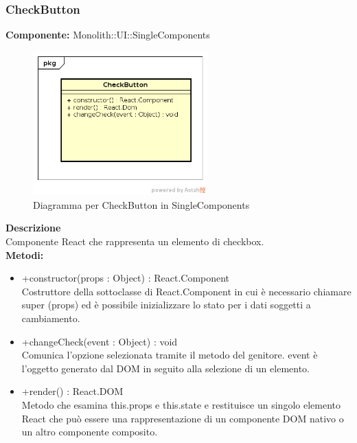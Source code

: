 \subsubsection{CheckButton}
\textbf{Componente:}  Monolith::UI::SingleComponents\\
   \FloatBarrier
   \begin{figure}[ht]
   \centering
   \includegraphics[width=0.6\textwidth]{img/single-CheckButton.png}
   \caption{{Diagramma per CheckButton in SingleComponents}}
\end{figure}
\FloatBarrier
\textbf{Descrizione}\\
Componente React che rappresenta un elemento di checkbox. \\
\textbf{Metodi:} 
\begin{itemize}

\item +constructor(props : Object) : React.Component 
\\
Costruttore della sottoclasse di React.Component in cui è necessario chiamare super (props) ed è possibile inizializzare lo stato per i dati soggetti a cambiamento.

\item +changeCheck(event : Object) : void  
\\
Comunica l’opzione selezionata tramite il metodo del genitore. event è l'oggetto generato dal DOM in seguito alla selezione di un elemento.

\item +render() : React.DOM 
\\
Metodo che esamina this.props e this.state e restituisce un singolo elemento React che può essere una rappresentazione di un componente DOM nativo o un altro componente composito.

\end{itemize}

